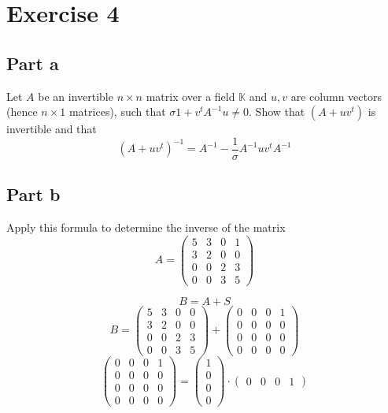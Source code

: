 \documentclass[a4paper]{article}
\theoremstyle{definition}
\begin{document}
\section{Exercise 4}
\subsection{Part a}
\begin{ex}
  Let $A$ be an invertible $n\times n$ matrix over a field $\mathbb K$ and $u,v$ are
  column vectors (hence $n\times 1$ matrices), such that $\sigma  1 + v^t A^{-1} u \neq 0$.
  Show that $(A + uv^t)$ is invertible and that
  \[ (A + uv^t)^{-1} = A^{-1} - \frac1{\sigma} A^{-1} uv^t A^{-1} \]
\end{ex}

\subsection{Part b}
\begin{ex}
  Apply this formula to determine the inverse of the matrix
  \[
    A = \begin{pmatrix}
      5 & 3 & 0 & 1 \\
      3 & 2 & 0 & 0 \\
      0 & 0 & 2 & 3 \\
      0 & 0 & 3 & 5
    \end{pmatrix}
  \]
\end{ex}

\[
  B = A + S
\] \[
  B = \begin{pmatrix} 5 & 3 & 0 & 0 \\ 3 & 2 & 0 & 0 \\ 0 & 0 & 2 & 3 \\ 0 & 0 & 3 & 5 \end{pmatrix}
  + \begin{pmatrix} 0 & 0 & 0 & 1 \\ 0 & 0 & 0 & 0 \\ 0 & 0 & 0 & 0 \\ 0 & 0 & 0 & 0 \end{pmatrix}
\] \[
  \begin{pmatrix} 0 & 0 & 0 & 1 \\ 0 & 0 & 0 & 0 \\ 0 & 0 & 0 & 0 \\ 0 & 0 & 0 & 0 \end{pmatrix}
    = \begin{pmatrix} 1 \\ 0 \\ 0 \\ 0 \end{pmatrix} \cdot \begin{pmatrix} 0 & 0 & 0 & 1 \end{pmatrix}
\]
\end{document}
